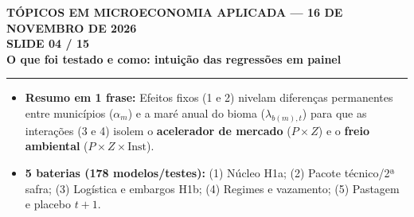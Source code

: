 \documentclass[11pt,a4paper]{article}
\newcommand{\slidenum}{1}
\begin{document}
\newpage

\renewcommand{\slidenum}{4}
\noindent
\begin{minipage}{\textwidth}
\begin{center}
{\color{cinza}\footnotesize\textbf{TÓPICOS EM MICROECONOMIA APLICADA --- 16 DE NOVEMBRO DE 2026}\\[1.2mm]}
{\color{cinza}\bfseries\Large SLIDE 04 / 15\\[1.5mm]}
{\color{verde}\bfseries\LARGE O que foi testado e como: intuição das regressões em painel\\[2.5mm]}
\rule{\textwidth}{1pt}
\end{center}
\end{minipage}
\vspace{1.5mm}

\begin{tcolorbox}[title={\bfseries\small ÂNCORAS EMPÍRICAS E CONCEITUAIS DO SLIDE}]
\begin{itemize}[leftmargin=*,itemsep=1mm,topsep=0.5mm]
    \item \textbf{Resumo em 1 frase:} Efeitos fixos (1 e 2) nivelam diferenças permanentes entre municípios ($\alpha_m$) e a maré anual do bioma ($\lambda_{b(m),t}$) para que as interações (3 e 4) isolem o \textbf{acelerador de mercado} ($P \times Z$) e o \textbf{freio ambiental} ($P \times Z \times \text{Inst}$).
    \item \textbf{5 baterias (178 modelos/testes):} (1) Núcleo H1a; (2) Pacote técnico/2ª safra; (3) Logística e embargos H1b; (4) Regimes e vazamento; (5) Pastagem e placebo $t+1$.
\end{itemize}
\end{tcolorbox}
\vspace{2mm}
\end{document}
